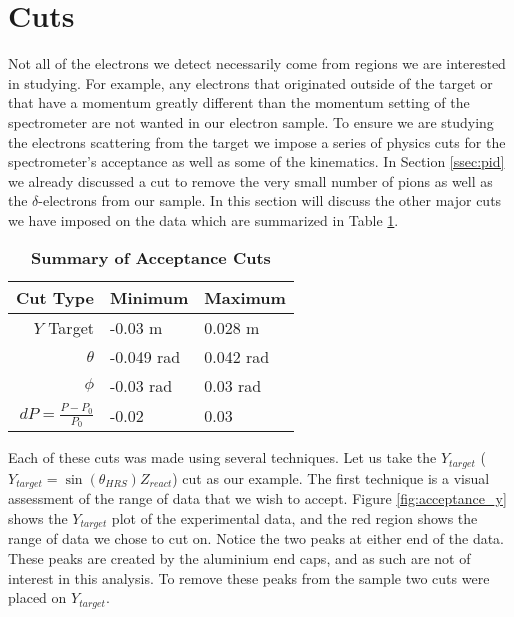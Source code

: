
\section{Cuts}
\label{sec:cuts}

Not all of the electrons we detect necessarily come from regions we are interested in studying. For example, any electrons that originated outside of the target or that have a momentum greatly different than the momentum setting of the spectrometer are not wanted in our electron sample. To ensure we are studying the electrons scattering from the target we impose a series of physics cuts for the spectrometer's acceptance as well as some of the kinematics. In Section \ref{ssec:pid} we already discussed a cut to remove the very small number of pions as well as the $\delta$-electrons from our sample. In this section will discuss the other major cuts we have imposed on the data which are summarized in Table \ref{tab:cuts}. 

\vspace{5mm}

\begin{table}[!h]
\centering
\begin{tabular}{|r | l l|}
\hline
\textbf{Cut Type} & \textbf{Minimum} & \textbf{Maximum}\\
\hline
$Y$ Target & -0.03 m & 0.028 m\\ 
$\theta$ & -0.049 rad & 0.042 rad\\ 
$\phi$ & -0.03 rad & 0.03 rad\\ 
$dP = \frac{P-P_0}{P_0}$ & -0.02 & 0.03\\ 
\hline
\end{tabular}
\caption[Summary of Acceptance Cuts]{{\bf{Summary of Acceptance Cuts}} }
\label{tab:cuts}
\end{table}

Each of these cuts was made using several techniques. Let us take the $Y_{target}$ ($Y_{target}=\sin\left(\theta_{HRS}\right)Z_{react}$) cut as our example. The first technique is a visual assessment of the range of data that we wish to accept. Figure \ref{fig:acceptance_y} shows the $Y_{target}$ plot of the experimental data, and the red region shows the range of data we chose to cut on. Notice the two peaks at either end of the data. These peaks are created by the aluminium end caps, and as such are not of interest in this analysis. To remove these peaks from the sample two cuts were placed on $Y_{target}$. 

